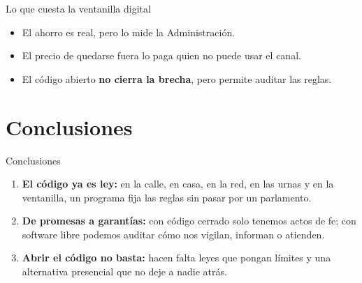 \documentclass[aspectratio=169,12pt]{beamer}
\def\navprev{}
\def\navnext{}
\newcommand{\nav}[2]{\gdef\navprev{#1}\gdef\navnext{#2}}
\begin{document}
\nav{Public Code}{}
\begin{frame}{Lo que cuesta la ventanilla digital}
  \begin{itemize}
    \item El ahorro es real, pero lo mide la Administración.
    \item El precio de quedarse fuera lo paga quien no puede usar el canal.
    \item El código abierto \alert{\textbf{no cierra la brecha}}, pero permite auditar las reglas.
  \end{itemize}
\end{frame}

\nav{}{}
\section{Conclusiones}

\begin{frame}{Conclusiones}
  \vspace{0.3cm}
  \begin{enumerate}
    \item \textbf{El código ya es ley:} en la calle, en casa, en la red, en las urnas y en la ventanilla, un programa fija las reglas sin pasar por un parlamento.\vspace{0.3cm}
    \item[\color{white}2.] {\color{white}\textbf{De promesas a garantías:} con código cerrado solo tenemos actos de fe; con software libre podemos auditar cómo nos vigilan, informan o atienden.}\vspace{0.3cm}
    \item[\color{white}3.] {\color{white}\textbf{Abrir el código no basta:} hacen falta leyes que pongan límites y una alternativa presencial que no deje a nadie atrás.}
  \end{enumerate}
\end{frame}
\end{document}
